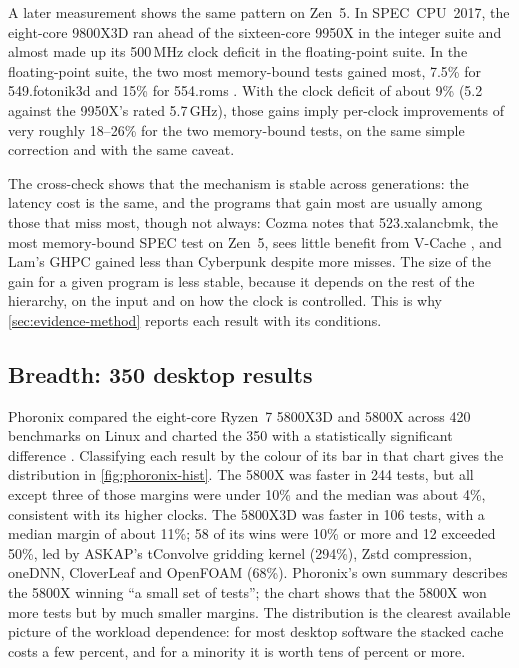 A later measurement shows the same pattern on Zen~5. In SPEC~CPU~2017, the eight-core 9800X3D ran ahead of the sixteen-core 9950X in the integer suite and almost made up its 500\,MHz clock deficit in the floating-point suite. In the floating-point suite, the two most memory-bound tests gained most, 7.5\% for 549.fotonik3d and 15\% for 554.roms \cite{cozmaAMDs9800X3D2nd2024}. With the clock deficit of about 9\% (5.2 against the 9950X's rated 5.7\,GHz), those gains imply per-clock improvements of very roughly 18--26\% for the two memory-bound tests, on the same simple correction and with the same caveat.

The cross-check shows that the mechanism is stable across generations: the latency cost is the same, and the programs that gain most are usually among those that miss most, though not always: Cozma notes that 523.xalancbmk, the most memory-bound SPEC test on Zen~5, sees little benefit from V-Cache \cite{cozmaAMDs9800X3D2nd2024}, and Lam's GHPC gained less than Cyberpunk despite more misses. The size of the gain for a given program is less stable, because it depends on the rest of the hierarchy, on the input and on how the clock is controlled. This is why \cref{sec:evidence-method} reports each result with its conditions.

\subsection{Breadth: 350 desktop results}
\label{sec:phoronix}
Phoronix compared the eight-core Ryzen~7 5800X3D and 5800X across 420 benchmarks on Linux and charted the 350 with a statistically significant difference \cite{larabelAMDRyzen72022}. Classifying each result by the colour of its bar in that chart gives the distribution in \cref{fig:phoronix-hist}. The 5800X was faster in 244 tests, but all except three of those margins were under 10\% and the median was about 4\%, consistent with its higher clocks. The 5800X3D was faster in 106 tests, with a median margin of about 11\%; 58 of its wins were 10\% or more and 12 exceeded 50\%, led by ASKAP's tConvolve gridding kernel (294\%), Zstd compression, oneDNN, CloverLeaf and OpenFOAM (68\%). Phoronix's own summary describes the 5800X winning ``a small set of tests''; the chart shows that the 5800X won more tests but by much smaller margins. The distribution is the clearest available picture of the workload dependence: for most desktop software the stacked cache costs a few percent, and for a minority it is worth tens of percent or more.

